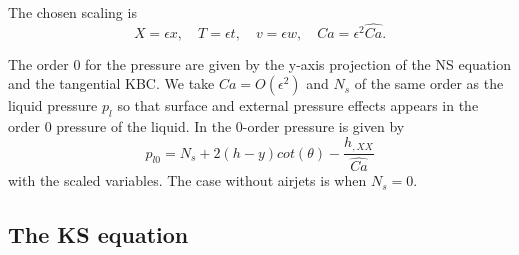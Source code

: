 \documentclass[12pt]{article}
\begin{document}
The chosen scaling is $$X=\epsilon x, \quad T=\epsilon t, \quad v=\epsilon w, \quad Ca=\epsilon^2 \hat{Ca}.$$

The order 0 for the pressure are given by the y-axis projection of the NS equation and the tangential KBC. We take $Ca=O(\epsilon^2)$ and $N_s$ of the same order as the liquid pressure $p_l$ so that surface and external pressure effects appears in the order 0 pressure of the liquid. In the 0-order pressure is given by $$p_{l0} = N_s+2(h-y)cot(\theta)-\frac{h_{,XX}}{\hat{Ca}}$$ with the scaled variables. The case without airjets is when $N_s=0$.

\subsection{The KS equation}

\printbibliography
\end{document}
